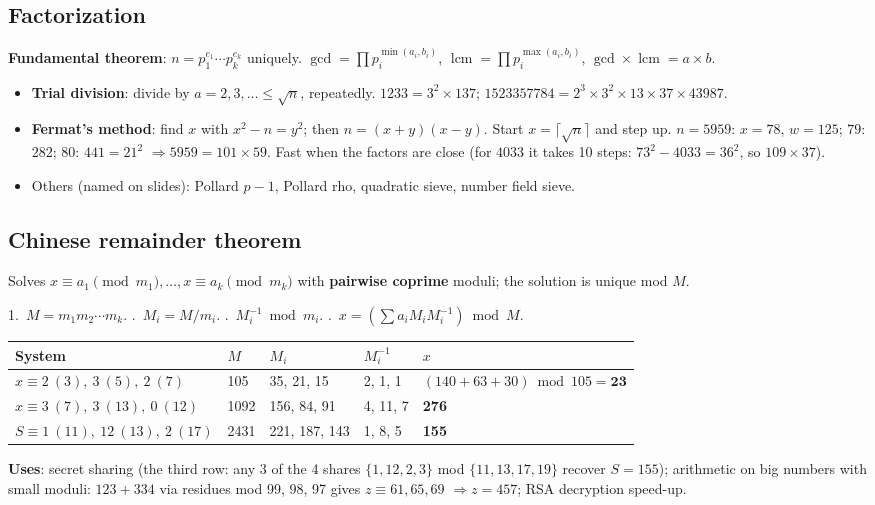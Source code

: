 \subsection{Factorization}
\textbf{Fundamental theorem}: $n = p_1^{e_1} \cdots p_k^{e_k}$ uniquely. $\gcd = \prod p_i^{\min(a_i, b_i)}$, \;$\operatorname{lcm} = \prod p_i^{\max(a_i, b_i)}$, \;$\gcd \times \operatorname{lcm} = a \times b$.
\begin{itemize}
  \item \textbf{Trial division}: divide by $a = 2, 3, \dots \le \sqrt n$, repeatedly. $1233 = 3^2 \times 137$; $1523357784 = 2^3 \times 3^2 \times 13 \times 37 \times 43987$.
  \item \textbf{Fermat's method}: find $x$ with $x^2 - n = y^2$; then $n = (x + y)(x - y)$. Start $x = \lceil\sqrt n\rceil$ and step up. $n = 5959$: $x = 78$, $w = 125$; $79$: $282$; $80$: $441 = 21^2$ $\Rightarrow 5959 = 101 \times 59$. Fast when the factors are close (for $4033$ it takes 10 steps: $73^2 - 4033 = 36^2$, so $109 \times 37$).
  \item Others (named on slides): Pollard $p - 1$, Pollard rho, quadratic sieve, number field sieve.
\end{itemize}

\subsection{Chinese remainder theorem}
Solves $x \equiv a_1 \pmod{m_1}, \dots, x \equiv a_k \pmod{m_k}$ with \textbf{pairwise coprime} moduli; the solution is unique mod $M$.
\begin{keybox}[title=Four steps]
1.\ $M = m_1 m_2 \cdots m_k$. .\ $M_i = M / m_i$. .\ $M_i^{-1} \bmod m_i$. .\ $x = \left(\sum a_i M_i M_i^{-1}\right) \bmod M$.
\end{keybox}
\begin{center}\small
\begin{tabular}{@{}lllll@{}}
\toprule
System & $M$ & $M_i$ & $M_i^{-1}$ & $x$\\
\midrule
$x \equiv 2 \ (3),\ 3\ (5),\ 2\ (7)$ & 105 & 35, 21, 15 & 2, 1, 1 & $(140 + 63 + 30) \bmod 105 = \mathbf{23}$\\
$x \equiv 3\ (7),\ 3\ (13),\ 0\ (12)$ & 1092 & 156, 84, 91 & 4, 11, 7 & \textbf{276}\\
$S \equiv 1\ (11),\ 12\ (13),\ 2\ (17)$ & 2431 & 221, 187, 143 & 1, 8, 5 & \textbf{155}\\
\bottomrule
\end{tabular}
\end{center}
\textbf{Uses}: secret sharing (the third row: any 3 of the 4 shares $\{1, 12, 2, 3\}$ mod $\{11, 13, 17, 19\}$ recover $S = 155$); arithmetic on big numbers with small moduli: $123 + 334$ via residues mod 99, 98, 97 gives $z \equiv 61, 65, 69$ $\Rightarrow z = 457$; RSA decryption speed-up.

